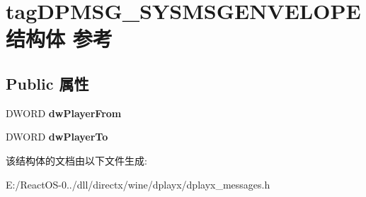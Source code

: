 \hypertarget{structtag_d_p_m_s_g___s_y_s_m_s_g_e_n_v_e_l_o_p_e}{}\section{tag\+D\+P\+M\+S\+G\+\_\+\+S\+Y\+S\+M\+S\+G\+E\+N\+V\+E\+L\+O\+P\+E结构体 参考}
\label{structtag_d_p_m_s_g___s_y_s_m_s_g_e_n_v_e_l_o_p_e}
\subsection*{Public 属性}
\begin{DoxyCompactItemize}
\item 
\mbox{\label{structtag_d_p_m_s_g___s_y_s_m_s_g_e_n_v_e_l_o_p_e_a152d0113728ab8dcfea1c4e8758d8096}} 
D\+W\+O\+RD {\bfseries dw\+Player\+From}
\item 
\mbox{\label{structtag_d_p_m_s_g___s_y_s_m_s_g_e_n_v_e_l_o_p_e_a902f48826b6e9a3cf1c93c3635e18ea5}} 
D\+W\+O\+RD {\bfseries dw\+Player\+To}
\end{DoxyCompactItemize}


该结构体的文档由以下文件生成\+:\begin{DoxyCompactItemize}
\item 
E\+:/\+React\+O\+S-\/0../dll/directx/wine/dplayx/dplayx\+\_\+messages.\+h\end{DoxyCompactItemize}
